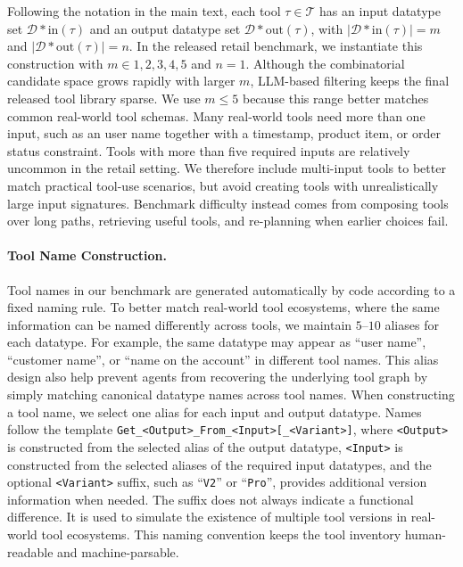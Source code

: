 \documentclass{llmxive}
\begin{document}
Following the notation in the main text, each tool $\tau \in \mathcal{T}$ has an input datatype set $\mathcal{D}*{\mathrm{in}}(\tau)$ and an output datatype set $\mathcal{D}*{\mathrm{out}}(\tau)$, with $|\mathcal{D}*{\mathrm{in}}(\tau)|=m$ and $|\mathcal{D}*{\mathrm{out}}(\tau)|=n$.
In the released retail benchmark, we instantiate this construction with $m\in{1,2,3,4,5}$ and $n=1$.
Although the combinatorial candidate space grows rapidly with larger $m$, LLM-based filtering keeps the final released tool library sparse.
We use $m\leq 5$ because this range better matches common real-world tool schemas.
Many real-world tools need more than one input, such as an user name together with a timestamp, product item, or order status constraint.
Tools with more than five required inputs are relatively uncommon in the retail setting.
We therefore include multi-input tools to better match practical tool-use scenarios, but avoid creating tools with unrealistically large input signatures.
Benchmark difficulty instead comes from composing tools over long paths, retrieving useful tools, and re-planning when earlier choices fail.

\paragraph{Tool Name Construction.}
Tool names in our benchmark are generated automatically by code according to a fixed naming rule.
To better match real-world tool ecosystems, where the same information can be named differently across tools, we maintain $5$--$10$ aliases for each datatype.
For example, the same datatype may appear as ``user name'', ``customer name'', or ``name on the account'' in different tool names.
This alias design also help prevent agents from recovering the underlying tool graph by simply matching canonical datatype names across tool names.
When constructing a tool name, we select one alias for each input and output datatype.
Names follow the template \texttt{Get\_<Output>\_From\_<Input>[\_<Variant>]}, where \texttt{<Output>} is constructed from the selected alias of the output datatype, \texttt{<Input>} is constructed from the selected aliases of the required input datatypes, and the optional \texttt{<Variant>} suffix, such as ``\texttt{V2}'' or ``\texttt{Pro}'', provides additional version information when needed. 
The suffix does not always indicate a functional difference.
It is used to simulate the existence of multiple tool versions in real-world tool ecosystems.
This naming convention keeps the tool inventory human-readable and machine-parsable.
\end{document}
